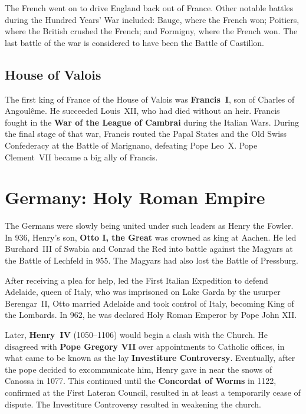 The French went on to drive England back out of France.
Other notable battles during the Hundred Years' War included:
Bauge, where the French won;
Poitiers, where the British crushed the French;
and Formigny, where the French won.
The last battle of the war is considered to have been the Battle of Castillon.

\subsection*{House of Valois}

The first king of France of the House of Valois was \textbf{Francis~I}, son of Charles of Angoul\^eme.
He succeeded Louis~XII, who had died without an heir.
Francis fought in the \textbf{War of the League of Cambrai} during the Italian Wars.
During the final stage of that war, Francis routed the Papal States and the Old Swiss Confederacy
at the Battle of Marignano, defeating Pope Leo~X.
Pope Clement~VII became a big ally of Francis.

\section{Germany: Holy Roman Empire}

The Germans were slowly being united under such leaders as Henry the Fowler.
In 936, Henry's son, \textbf{Otto I, the Great} was crowned as king at Aachen.
He led Burchard~III of Swabia and Conrad the Red into battle
against the Magyars at the Battle of Lechfeld in 955.
The Magyars had also lost the Battle of Pressburg.

After receiving a plea for help, led the First Italian Expedition to defend Adelaide, queen of Italy,
who was imprisoned on Lake Garda by the usurper Berengar~II,
Otto married Adelaide and took control of Italy, becoming King of the Lombards.
In 962, he was declared Holy Roman Emperor by Pope John XII\@.

Later, \textbf{Henry~IV} (1050--1106) would begin a clash with the Church.
He disagreed with \textbf{Pope Gregory VII} over appointments to Catholic offices,
in what came to be known as the lay \textbf{Investiture Controversy}.
Eventually, after the pope decided to excommunicate him, Henry gave in near the snows of Canossa in 1077.
This continued until the \textbf{Concordat of Worms} in 1122,
confirmed at the First Lateran Council,
resulted in at least a temporarily cease of dispute.
The Investiture Controversy resulted in weakening the church.

